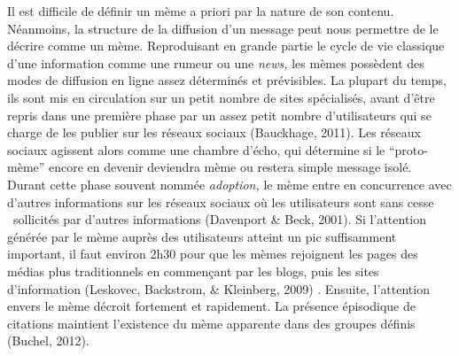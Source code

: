 Il est difficile de d\'efinir un m\`eme a priori par la nature de son contenu. N\'eanmoins, la structure de la diffusion d{\textquoteright}un message peut nous permettre de le d\'ecrire comme un m\`eme. Reproduisant en grande partie le cycle de vie classique d{\textquoteright}une information comme une rumeur ou une \textit{news, }les m\`emes poss\`edent des modes de diffusion en ligne assez d\'etermin\'es et pr\'evisibles. La plupart du temps, ils sont mis en circulation sur un petit nombre de sites sp\'ecialis\'es, avant d{\textquoteright}\^etre repris dans une premi\`ere phase par un assez petit nombre d{\textquoteright}utilisateurs qui se charge de les publier sur les r\'eseaux sociaux (Bauckhage, 2011). Les r\'eseaux sociaux agissent alors comme une chambre d{\textquoteright}\'echo, qui d\'etermine si le {\textquotedblleft}proto-m\`eme{\textquotedblright} encore en devenir deviendra m\`eme ou restera simple message isol\'e. Durant cette phase souvent nomm\'ee \textit{adoption,} le m\`eme entre en concurrence avec d{\textquoteright}autres informations sur les r\'eseaux sociaux o\`u les utilisateurs sont sans cesse \ sollicit\'es par d{\textquoteright}autres informations (Davenport \& Beck, 2001). Si l{\textquoteright}attention g\'en\'er\'ee par le m\`eme aupr\`es des utilisateurs atteint un pic suffisamment important, il faut environ 2h30 pour que les m\`emes rejoignent les pages des m\'edias plus traditionnels en commen\c{c}ant par les blogs, puis les sites d{\textquoteright}information (Leskovec, Backstrom, \& Kleinberg, 2009) . Ensuite, l{\textquoteright}attention envers le m\`eme d\'ecroit fortement et rapidement. La pr\'esence \'episodique de citations maintient l{\textquoteright}existence du m\`eme apparente dans des groupes d\'efinis (Buchel, 2012).
